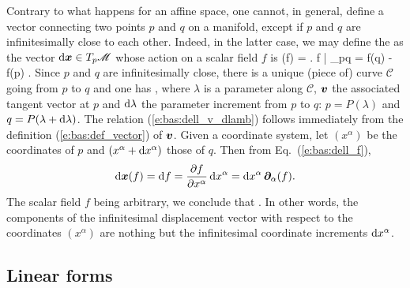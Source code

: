 Contrary to what happens for an affine space, one cannot, in general, define a vector connecting two points $p$ and $q$ on a manifold, except if $p$ and $q$ are infinitesimally close to each other. Indeed, in the latter case, we may define
the  as the vector $\mathrm{d}\bm{x}\in{{T_p\mathscr{M}}}$ whose action on a scalar field $f$ is
\be \label{e:bas:dell_f}
  \D{}(f) = \left. \D f \right| _{p\rightarrow q} = f(q) - f(p) .
\ee
Since $p$ and $q$ are infinitesimally close, there is a unique (piece of) curve
$\mathcal{C}$ going
from $p$ to $q$ and one has
\be \label{e:bas:dell_v_dlamb}
  ,
\ee
where $\lambda$ is a parameter along $\mathcal{C}$, $\bm{v}$ the associated tangent
vector at $p$ and $\mathrm{d}\lambda$ the parameter
increment from $p$ to $q$: $p=P(\lambda)$ and $q=P(\lambda+\mathrm{d}\lambda)$.
The relation (\ref{e:bas:dell_v_dlamb}) follows immediately from the definition
(\ref{e:bas:def_vector}) of $\bm{v}$.
Given a coordinate system, let $(x^\alpha)$ be the coordinates
of $p$ and $(x^\alpha+\mathrm{d} x^\alpha)$ those of $q$. Then from Eq.~(\ref{e:bas:dell_f}),
\[
  \mathrm{d}\bm{x}(f) =   \mathrm{d} f  = \frac{\partial f}{\partial x^\alpha} \, \mathrm{d} x^\alpha
  = \mathrm{d} x^\alpha \, \bm{\partial}_\alpha(f) .
\]
The scalar field $f$ being arbitrary, we conclude that
\be \label{e:bas:dell_dxa_wpar}
   .
\ee
In other words, the components of the infinitesimal displacement vector with respect
to the coordinates $(x^\alpha)$ are nothing but the infinitesimal coordinate
increments $\mathrm{d} x^\alpha$.

\subsection{Linear forms} \label{s:bas:linear_form}

